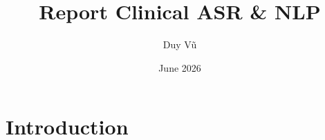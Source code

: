 \documentclass{article}
\title{Report Clinical ASR & NLP}
\author{Duy Vũ}
\date{June 2026}
\begin{document}
\maketitle

\section{Introduction}
\end{document}
